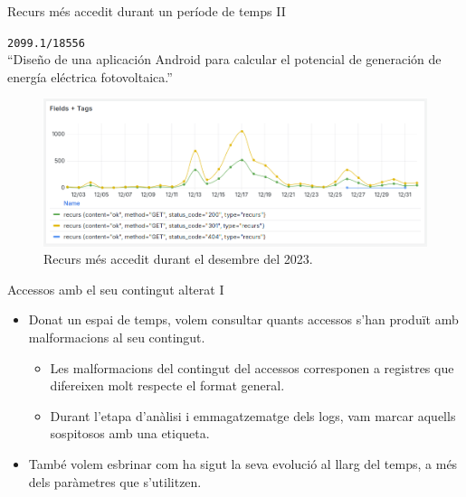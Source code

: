 \begin{frame}{Recurs més accedit durant un període de temps II}
    \begin{center}
        \texttt{2099.1/18556} \\
        ``Diseño de una aplicación Android para calcular el potencial de generación de energía eléctrica fotovoltaica.''
    \end{center}
    \begin{figure}
        \includegraphics[width=\textwidth]{figures/most-accessed-resource}
        \caption{Recurs més accedit durant el desembre del 2023.}\label{fig:use-case-1}
    \end{figure}
\end{frame}

\begin{frame}{Accessos amb el seu contingut alterat I}
    \begin{itemize}
        \item Donat un espai de temps, volem consultar quants accessos s'han produït amb malformacions al seu contingut.

        \begin{itemize}
            \item Les malformacions del contingut del accessos corresponen a registres que difereixen molt respecte el format general.
            \item Durant l'etapa d'anàlisi i emmagatzematge dels logs, vam marcar aquells sospitosos amb una etiqueta.
        \end{itemize}

        \item També volem esbrinar com ha sigut la seva evolució al llarg del temps, a més dels paràmetres que s'utilitzen.
    \end{itemize}
\end{frame}

